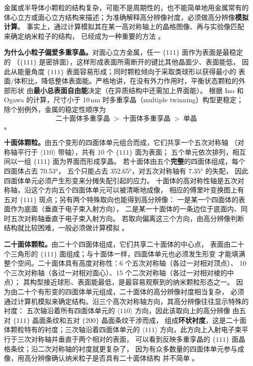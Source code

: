 金属或半导体小颗粒的结构复杂，可能不是周期性的，也不能简单地用金属常有的
体心立方或面心立方结构来描述；为准确解释高分辨像衬度，必须做高分辨像\textbf{模拟计算}。
事实上，通过计算模拟其在某一高对称轴上的晶格图像、再与实验像匹配来确定纳米粒子的结构，
已经成为一种重要的方法
。

\begin{principle}
\textbf{为什么小粒子偏爱多重孪晶。}对面心立方金属，任一 $\{111\}$ 面作为表面是最稳定的
（$\{111\}$ 是密排面），这样形成表面所需断开的键比其他晶面少、表面能低，
因此从能量角度 $\{111\}$ 表面容易形成；同时颗粒倾向于采取类球形以获得最小的
表面/体积比，降低整体表面能。严格地讲，在没有外力作用时，平衡状态颗粒的外部形状
由\textbf{最小总表面自由能}决定（在异质结构中还需加上界面能）。
根据 Ino 和 Ogawa 的计算，尺寸小于 10\,nm 时多重孪晶（multiple twinning）构型更稳定；
除个别例外，金属的稳定性顺序为
\[
\text{二十面体多重孪晶} \;>\; \text{十面体多重孪晶} \;>\; \text{单晶}
\]
。

\textbf{十面体颗粒。}由五个变形的四面体单元组合而成，它们共享一个五次对称轴
（对称轴平行于 $\langle 110\rangle$ 带轴），共有 10 个 $\{111\}$ 面为表面；
五个单元依次排列，相互间以一组 $\{111\}$ 面为界面而形成孪晶。
若十面体由五个\textbf{完整}的四面体组成，每个四面体占去 70.53°，
五个只能占去 352.65°，对五次对称轴有 7.35° 的失配，
因此四面体单元必须产生形变来分摊失配引起的应力。
十面体的高对称性轴是五次对称轴，沿这个方向五个四面体单元可以被清晰地成像，
相应的傅里叶变换图上有五对 $\{111\}$ 斑点；另有两个特殊取向也能得到高分辨像：
一是某一个四面体的表面作为底面（垂直于电子束入射方向），
二是某一十面体的一条边位于底面内、同时五次对称轴垂直于电子束入射方向。
若取向偏离这三个方向，由高分辨像判断结构就比较困难，一般必须做计算模拟
。

\textbf{二十面体颗粒。}由二十个四面体组成，它们共享二十面体的中心点，
表面由二十个三角形的 $\{111\}$ 面组成；与十面体一样，四面体单元也必须发生形变
才能填满整个空间。二十面体具有高度对称性：6 个五次对称轴（各过一对相对顶点）、
10 个三次对称轴（各过一对相对面心）、15 个二次对称轴（各过一对相对棱的中点）；
其构型接近球形、表面能最低，是最容易观察到的纳米颗粒形态之一。
因为由二十个有形变的四面体单元组成，二十面体的高分辨像衬度相当复杂，
必须通过计算机模拟来确定结构。沿三个高次对称轴方向，其高分辨像往往显示特殊的衬度：
五次轴沿着所有四面体单元的 $\langle 110\rangle$ 方向，因此该取向上的高分辨像
由五对 $\{111\}$ 晶面条纹和五对 $\{200\}$ 晶面条纹干涉而成，
组成\textbf{环状衬度}，这是二十面体颗粒特有的衬度；三次轴沿着四面体单元的
$\langle 111\rangle$ 方向，此方向上入射电子束平行于三次对称轴并垂直于两个相对的表面，
可以看到反映多重孪晶的 $\{111\}$ 面晶格条纹；沿二次对称轴的衬度就更复杂了，
因为有众多数量的四面体单元参与成像，用高分辨像确认纳米粒子是否具有二十面体结构
并不简单
。


\end{principle}
